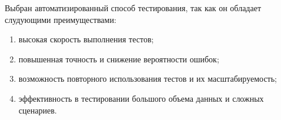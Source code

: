 \documentclass[14pt,a4paper,final]{extreport}
\begin{document}
Выбран автоматизированный способ тестирования, так как он обладает слудующими преимуществами:
\begin{enumerate}[label=\asbuk*),ref=\asbuk*]
	\item высокая скорость выполнения тестов;

	\item повышенная точность и снижение вероятности ошибок;

	\item возможность повторного использования тестов и их масштабируемость;
	\item эффективность в тестировании большого объема данных и сложных сценариев.
\end{enumerate}

\pagebreak %


\end{document}

